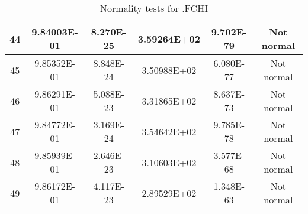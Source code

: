 \begin{table}[h]
\begin{tabular}{|c|c|c|c|c|c|}
		44 & 9.84003E-01 & 8.270E-25 & 3.59264E+02 & 9.702E-79 & Not normal\\\hline
		45 & 9.85352E-01 & 8.848E-24 & 3.50988E+02 & 6.080E-77 & Not normal\\\hline
		46 & 9.86291E-01 & 5.088E-23 & 3.31865E+02 & 8.637E-73 & Not normal\\\hline
		47 & 9.84772E-01 & 3.169E-24 & 3.54642E+02 & 9.785E-78 & Not normal\\\hline
		48 & 9.85939E-01 & 2.646E-23 & 3.10603E+02 & 3.577E-68 & Not normal\\\hline
		49 & 9.86172E-01 & 4.117E-23 & 2.89529E+02 & 1.348E-63 & Not normal\\\hline
	\end{tabular}
	\caption{Normality tests for .FCHI}
\end{table}
